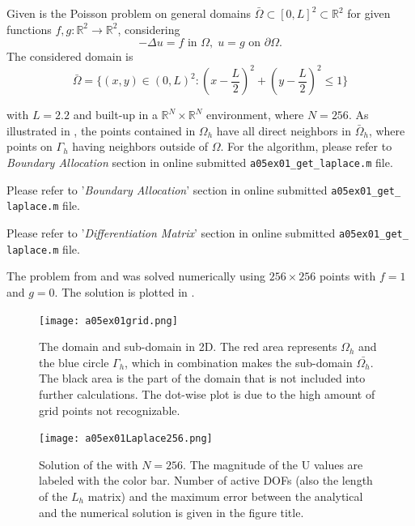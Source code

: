 \newcommand{\assignmentDate}{November 25th, 2019}



\newcommand{\Lhalf}{\frac{L}{2}}
Given is the Poisson problem on general domains $\bar{\Omega} \subset [0, L]^2 \subset \mathbb{R}^2$ for given functions $f, g \colon \mathbb{R}^2 \rightarrow \mathbb{R}^2$, considering
%
\begin{equation}
	\label{eq:problem}
	-\Delta u = f \text{ in } \Omega,\; u = g \text{ on } \partial \Omega \text{.}
\end{equation}
The considered domain is
\begin{equation}
	\label{eq:domain1}
	\bar{\Omega} = \{(x,y) \in (0,L)^2 \colon \left(x-\Lhalf \right)^2 + \left(y - \Lhalf \right)^2 \leq 1 \}
\end{equation}

with  $L =2.2$ and built-up in a $\mathbb{R}^N \times \mathbb{R}^N$ environment, where $N = 256$.
As illustrated in , the points contained in $\Omega_h$ have all direct neighbors in $\bar{\Omega}_h$, where points on $\Gamma_h$ having neighbors outside of $\Omega$.
For the algorithm, please refer to \textit{Boundary Allocation} section in online submitted \texttt{a05ex01\_get\_laplace.m} file.

%
Please refer to '\textit{Boundary Allocation}' section in online submitted \texttt{a05ex01\_get\_ laplace.m} file.

%
Please refer to '\textit{Differentiation Matrix}' section in online submitted \texttt{a05ex01\_get\_ laplace.m} file.

%
The problem from  and  was solved numerically using $256 \times 256$ points with $f = 1$ and $g = 0$.
The solution is plotted in .
%
\vspace*{\FigUpperVSpace}
\begin{figure}[H]
	\centering
	\texttt{[image: a05ex01grid.png]} 
	\caption{The domain and sub-domain in 2D. The red area represents $\Omega_h$ and the blue circle $\Gamma_h$, which in combination makes the sub-domain $\bar{\Omega_h}$.
			 The black area is the part of the domain that is not included into further calculations.
			 The dot-wise plot is due to the high amount of grid points not recognizable.}
	\label{fig:a05ex01grid}
\end{figure}
%
\vspace*{\FigUpperVSpace}
%
\begin{figure}[H]
	\centering
	\texttt{[image: a05ex01Laplace256.png]} 
	\caption{Solution of the  with $N = 256$.
			 The magnitude of the U values are labeled with the color bar.
			 Number of active DOFs (also the length of the $L_h$ matrix) and the maximum error between the analytical and the numerical solution is given in the figure title.}
	\label{fig:a05ex01Laplace256}
\end{figure}

